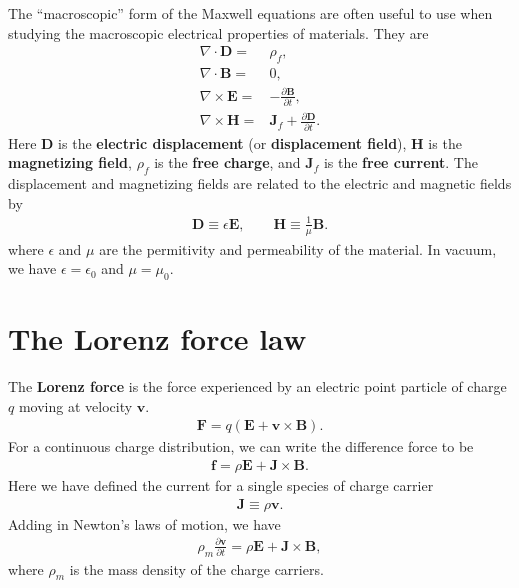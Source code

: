 \documentclass[12pt]{report}
\newcommand{\bv}{{\bm v}}
\newcommand{\bB}{{\bm B}}
\newcommand{\bD}{{\bm D}}
\newcommand{\bE}{{\bm E}}
\newcommand{\bF}{{\bm F}}
\newcommand{\bH}{{\bm H}}
\newcommand{\bJ}{{\bm J}}
\begin{document}
The ``macroscopic'' form of the Maxwell equations are often useful to use when studying the macroscopic electrical properties of materials.
They are
\begin{subequations}
\label{eq:macroscopic-Maxwell}
\begin{align}
    \nabla \cdot \bD
    =&
    \rho_f
    ,\\
    \nabla \cdot \bB
    =&
    0
    ,\\
    \nabla \times {\bE} 
    =&
    -
    \frac{\partial \bB}{\partial t}
    ,\\
    \nabla \times \bH
    =&
    \bJ_f + \frac{\partial \bD}{\partial t}
    .
\end{align}
\end{subequations}
Here $\bD$ is the \textbf{electric displacement} (or \textbf{displacement field}), $\bH$ is the \textbf{magnetizing field}, $\rho_f$ is the \textbf{free charge}, and $\bJ_f$ is the \textbf{free current}.
The displacement and magnetizing fields are related to the electric and magnetic fields by
\begin{align}
    \bD
    \equiv
    \epsilon \bE
    ,\qquad
    \bH
    \equiv
    \frac{1}{\mu} \bB
    .
\end{align}
where $\epsilon$ and $\mu$ are the permitivity and permeability of the material.
In vacuum, we have $\epsilon=\epsilon_0$ and $\mu=\mu_0$.

\section{The Lorenz force law}

The \textbf{Lorenz force} is the force experienced by an electric point particle of charge $q$ moving at velocity $\bv$.
\begin{align}
    \label{eq:lorenz-force-point}
    \bF
    =
    q\left(\bE + \bv \times \bB\right)
    .
\end{align}
For a continuous charge distribution, we can write the difference force to be 
\begin{align}
    \label{eq:lorenz-force-continuous}
    {\bm f}
    =
    \rho \bE
    +
    \bJ \times \bB
    .
\end{align}
Here we have defined the current for a single species of charge carrier
\begin{align}
    \label{eq:relation-current-charge-density}
    \bJ
    \equiv \rho \bv
    .
\end{align}
Adding in Newton's laws of motion, we have
\begin{align}
    \label{eq:Newtons-law-charge-carriers}
    \rho_m \frac{\partial \bv}{\partial t}
    =
    \rho \bE
    +
    \bJ \times \bB
    ,
\end{align}
where $\rho_m$ is the mass density of the charge carriers.
\end{document}
